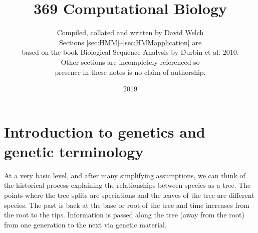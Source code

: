 \documentclass[11pt]{article}
\title{369 Computational Biology}
\author{Compiled, collated and written by David Welch\\ 
Sections \ref{sec:HMM}--\ref{sec:HMMapplication} are\\ based on the book Biological Sequence Analysis by Durbin et al. 2010. \\ Other sections are incompletely referenced so \\ presence in these notes is no claim of authorship.}
\date{2019}                                           %
\begin{document}
\maketitle

%
%

\tableofcontents
\newpage





%
\addtocounter{section}{9}
\addtocounter{page}{44}


\section{Introduction to genetics and genetic terminology }


At a very basic level, and after many simplifying assumptions, we can think of the historical process explaining the relationships between species as a tree.   The points where the tree splits are speciations and the leaves of the tree are different  species.  The past is back at the base or root of the tree and time increases from the root to the tips.  Information is passed along  the tree (away from the root) from one generation to the next via genetic material.
\end{document}
